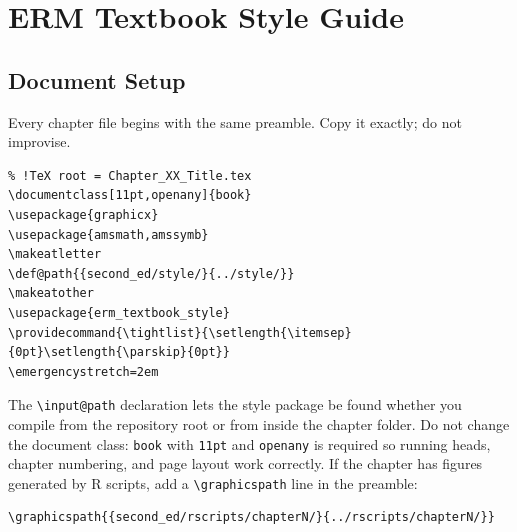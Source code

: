 \documentclass[11pt,openany]{book}
\makeatletter
\def@path{{./}{second_ed/style/}}
\providecommand{\tightlist}{\setlength{\itemsep}{0pt}\setlength{\parskip}{0pt}}
\newcommand{\code}[1]{\texttt{\small #1}}
\makeatother
\begin{document}
\setcounter{chapter}{-1}   %
\chapter{ERM Textbook Style Guide}
\label{chap:style-guide}


\section{Document Setup}
\label{sec:setup}

Every chapter file begins with the same preamble. Copy it exactly; do not improvise.

\begin{lstlisting}
% !TeX root = Chapter_XX_Title.tex
\documentclass[11pt,openany]{book}
\usepackage{graphicx}
\usepackage{amsmath,amssymb}
\makeatletter
\def@path{{second_ed/style/}{../style/}}
\makeatother
\usepackage{erm_textbook_style}
\providecommand{\tightlist}{\setlength{\itemsep}{0pt}\setlength{\parskip}{0pt}}
\emergencystretch=2em
\end{lstlisting}

The \code{\textbackslash input@path} declaration lets the style package be found whether you compile from the repository root or from inside the chapter folder. Do not change the document class: \code{book} with \code{11pt} and \code{openany} is required so running heads, chapter numbering, and page layout work correctly. If the chapter has figures generated by R scripts, add a \code{\textbackslash graphicspath} line in the preamble:

\begin{lstlisting}
\graphicspath{{second_ed/rscripts/chapterN/}{../rscripts/chapterN/}}
\end{lstlisting}
\end{document}
